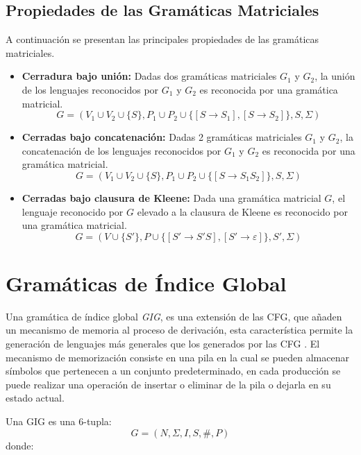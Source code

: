 \subsection{Propiedades de las Gramáticas Matriciales}

A continuación se presentan las principales propiedades de las gramáticas matriciales.

\begin{itemize}
    \item \textbf{Cerradura bajo unión:} Dadas dos gramáticas matriciales $G_1$ y $G_2$,
          la unión de los lenguajes reconocidos por $G_1$ y $G_2$ es reconocida por una gramática matricial.
          $$G=(V_1\cup V_2\cup\{S\} , P_1\cup P_2\cup\{[S\to S_1],[S\to S_2]\}, S,\Sigma)$$
    \item \textbf{Cerradas bajo concatenación:} Dadas 2 gramáticas matriciales $G_1$ y $G_2$, la concatenación de
          los lenguajes reconocidos por $G_1$ y $G_2$ es reconocida por una gramática matricial.
          $$G=(V_1\cup V_2\cup\{S\} , P_1\cup P_2\cup\{[S\to S_1 S_2]\}, S,\Sigma)$$
    \item \textbf{Cerradas bajo clausura de Kleene:} Dada una gramática matricial $G$, el lenguaje reconocido por
          $G$ elevado a la clausura de Kleene es reconocido por una gramática matricial.
          $$G=(V\cup\{S'\} , P\cup\{[S'\to S'S],[S'\to \varepsilon]\}, S',\Sigma)$$
\end{itemize}


\section{Gramáticas de Índice Global}

Una gramática de índice global \textit{GIG}, es una extensión de las CFG, que añaden un mecanismo
de memoria al proceso de derivación, esta característica permite la generación de lenguajes más generales que los generados
por las CFG \cite{globalIndexLanguages}.
El mecanismo de memorización consiste en una pila en la cual se pueden almacenar símbolos que pertenecen a un conjunto predeterminado,
en cada producción se puede realizar una operación de insertar o eliminar de la pila o dejarla en su estado actual.

Una GIG es una 6-tupla:
$$
    G = (N, \Sigma, I, S, \#, P)
$$
donde:

